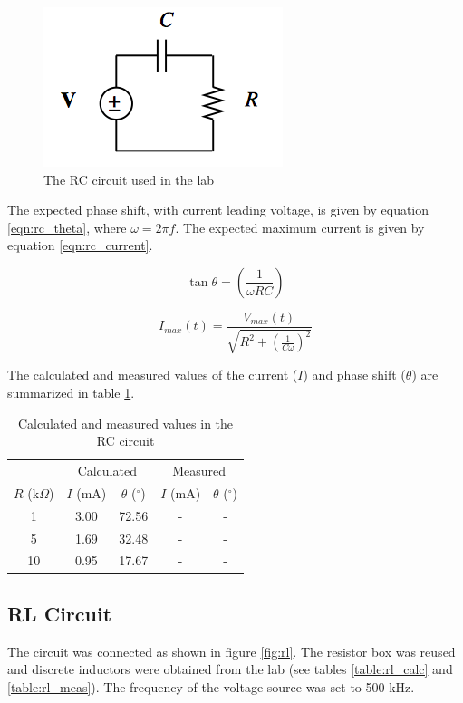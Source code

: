 \documentclass[12pt]{article}
\begin{document}
\begin{figure}[h]
	\centering
	\includegraphics[scale=0.6]{RC_circuit}
	\caption{The RC circuit used in the lab}
	\label{fig:rc}
\end{figure}

The expected phase shift, with current leading voltage, is given by equation \eqref{eqn:rc_theta}, where $\omega = 2\pi f$. The expected maximum current is given by equation \eqref{eqn:rc_current}.

\begin{equation}
	\tan { \theta  } =\left( \frac { 1 }{ \omega RC }  \right) 
	\label{eqn:rc_theta}
\end{equation}

\begin{equation}
		I_{max}(t) = \frac{V_{max}(t)}{\sqrt{R^2 + (\frac{1}{C\omega})^2} }
		\label{eqn:rc_current}
\end{equation}

\pagebreak
The calculated and measured values of the current ($I$) and phase shift ($\theta$) are summarized in table \ref{table:rc}.

\begin{table}[h]
	\centering
	\begin{tabular}{c c c c c}
		\toprule
		&				\multicolumn{2}{c}{Calculated}	& \multicolumn{2}{c}{Measured}	\\
		\cline{2-5}
		$R$ (k$\Omega$)	& $I$ (mA) 	& $\theta$ ($^\circ$) 	& $I$ (mA) 	& $\theta$ ($^\circ$) \\
		\hline
		1				& 3.00		& 72.56					& -			&	-	\\
		5				& 1.69		& 32.48					& -			&	-	\\
		10				& 0.95		& 17.67					& -			&	-	\\
		\toprule
	\end{tabular}
	\caption{Calculated and measured values in the RC circuit}
	\label{table:rc}
\end{table}

\subsection{RL Circuit}\label{sec:rl}
The circuit was connected as shown in figure \ref{fig:rl}. The resistor box was reused and discrete inductors were obtained from the lab (see tables \ref{table:rl_calc} and \ref{table:rl_meas}). The frequency of the voltage source was set to 500 kHz.
\end{document}
